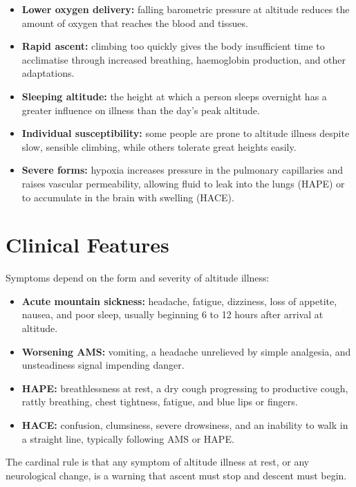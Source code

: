 \begin{itemize}
    \item \textbf{Lower oxygen delivery:} falling barometric pressure at altitude reduces the amount of oxygen that reaches the blood and tissues.
    \item \textbf{Rapid ascent:} climbing too quickly gives the body insufficient time to acclimatise through increased breathing, haemoglobin production, and other adaptations.
    \item \textbf{Sleeping altitude:} the height at which a person sleeps overnight has a greater influence on illness than the day's peak altitude.
    \item \textbf{Individual susceptibility:} some people are prone to altitude illness despite slow, sensible climbing, while others tolerate great heights easily.
    \item \textbf{Severe forms:} hypoxia increases pressure in the pulmonary capillaries and raises vascular permeability, allowing fluid to leak into the lungs (HAPE) or to accumulate in the brain with swelling (HACE).
\end{itemize}

\section*{Clinical Features}
Symptoms depend on the form and severity of altitude illness:

\begin{itemize}
    \item \textbf{Acute mountain sickness:} headache, fatigue, dizziness, loss of appetite, nausea, and poor sleep, usually beginning 6 to 12 hours after arrival at altitude.
    \item \textbf{Worsening AMS:} vomiting, a headache unrelieved by simple analgesia, and unsteadiness signal impending danger.
    \item \textbf{HAPE:} breathlessness at rest, a dry cough progressing to productive cough, rattly breathing, chest tightness, fatigue, and blue lips or fingers.
    \item \textbf{HACE:} confusion, clumsiness, severe drowsiness, and an inability to walk in a straight line, typically following AMS or HAPE.
\end{itemize}

The cardinal rule is that any symptom of altitude illness at rest, or any neurological change, is a warning that ascent must stop and descent must begin.

